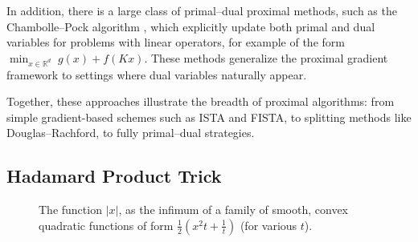 \documentclass[11pt, twoside]{report}
\begin{document}
In addition, there is a large class of primal--dual proximal methods, such as the Chambolle--Pock algorithm \cite{chambolle2011first}, which explicitly update both primal and dual variables for problems with linear operators, for example of the form $\min_{x \in \mathbb{R}^d} \; g(x) + f(Kx)$. These methods generalize the proximal gradient framework to settings where dual variables naturally appear.

Together, these approaches illustrate the breadth of proximal algorithms: from simple gradient-based schemes such as ISTA and FISTA, to splitting methods like Douglas--Rachford, to fully primal--dual strategies.



\subsection{Hadamard Product Trick} \label{subsec: hada}
\begin{figure}[h!]
    \centering
    \caption{The function $|x|$, as the infimum of a family of smooth, convex quadratic functions of form $\frac{1}{2}\left(x^2t + \frac{1}{t} \right)$ (for various $t$).}
    \label{fig:my_label}
\end{figure}
\end{document}
